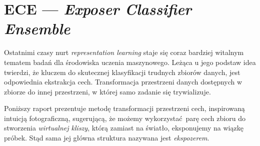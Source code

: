 \documentclass[]{article}
\begin{document}
\newenvironment{ridel}[2]
{
	\caption{Zbiór \emph{#2}}
    \label{tab:results}
	\centering
	\begin{tabular}{lS>{\color{red}}S}
		\\\toprule{limit} & {accuracy} & {\textsc{bac}} \\\midrule
	    \csvreader[head to column names]{#1}{}%
	    {\limit & \accuracy & \bac\\}%
	\end{tabular}
	
	\begin{tikzpicture}
	\begin{axis}[
	    grid=both,
	    grid style={line width=.1pt, draw=gray!10},
	    major grid style={line width=.2pt,draw=gray!50},
	    width=6cm,
	    height=8cm,
	    xmin=1, xmax=19,
	    ymin=.0, ymax=1,
	    ytick = {.5, .6, .7, .8, .9, 1},
	    yticklabels = { ~, 60\%, ~, 80\%, ~, 100\%},
	    xtick = {1, 4, 7, 10, 13, 16, 19},
		xticklabels = {~, 4,7,10,13,16,~},
		xlabel = Limit,
		minor tick num=2,
		xlabel style={font=\tiny,fill=white},
		ticklabel style={font=\tiny,fill=white}		]
		\addplot[color=black] table [x=limit, y=accuracy, col sep=comma] {#1};
		\addplot[color=red] table [x=limit, y=bac, col sep=comma] {#1};
	\end{axis}
	\end{tikzpicture}
}{}

\maketitle
\newpage
\section{ECE --- \emph{Exposer Classifier Ensemble}}

Ostatnimi czasy nurt \emph{representation learning} staje się coraz bardziej witalnym tematem badań dla środowiska uczenia maszynowego. Leżąca u jego podstaw idea twierdzi, że kluczem do skutecznej klasyfikacji trudnych zbiorów danych, jest odpowiednia ekstrakcja cech. Transformacja przestrzeni danych dostępnych w zbiorze do innej przestrzeni, w której samo zadanie się trywializuje. 

Poniższy raport prezentuje metodę transformacji przestrzeni cech, inspirowaną intuicją fotograficzną, sugerującą, że możemy wykorzystać parę cech zbioru do stworzenia \emph{wirtualnej kliszy}, którą zamiast na światło, eksponujemy na wiązkę próbek. Stąd sama jej główna struktura nazywana jest \emph{ekspozerem}.
\end{document}
